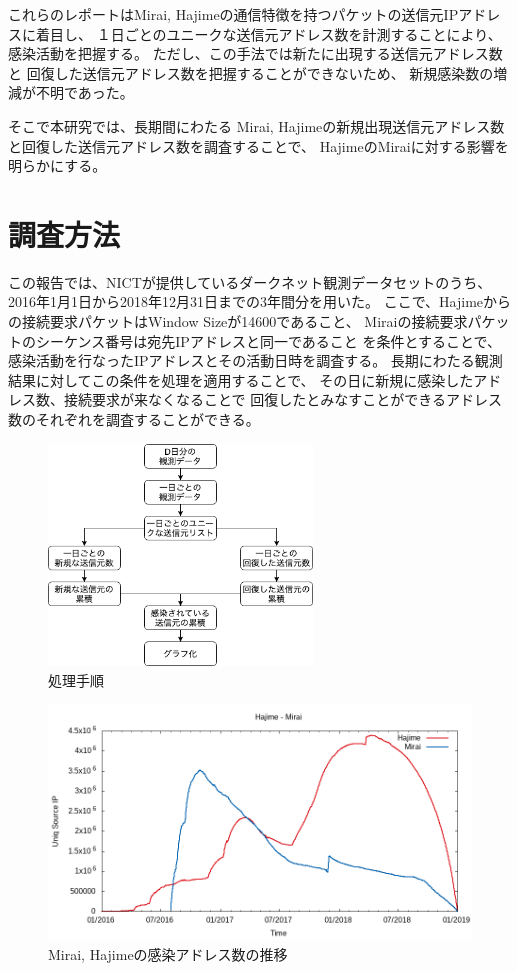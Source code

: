 \documentclass[a4j,fleqn,10pt]{jarticle}
\begin{document}
これらのレポートはMirai, Hajimeの通信特徴を持つパケットの送信元IPアドレスに着目し、
１日ごとのユニークな送信元アドレス数を計測することにより、感染活動を把握する。
ただし、この手法では新たに出現する送信元アドレス数と
回復した送信元アドレス数を把握することができないため、
新規感染数の増減が不明であった。
%

そこで本研究では、長期間にわたる
Mirai, Hajimeの新規出現送信元アドレス数と回復した送信元アドレス数を調査することで、
HajimeのMiraiに対する影響を明らかにする。
%


\section{調査方法}
この報告では、NICTが提供しているダークネット観測データセットのうち、
2016年1月1日から2018年12月31日までの3年間分を用いた。
%
ここで、Hajimeからの接続要求パケットはWindow Sizeが14600であること、
Miraiの接続要求パケットのシーケンス番号は宛先IPアドレスと同一であること\cite{nict18}
を条件とすることで、
感染活動を行なったIPアドレスとその活動日時を調査する。
%
長期にわたる観測結果に対してこの条件を処理を適用することで、
その日に新規に感染したアドレス数、接続要求が来なくなることで
回復したとみなすことができるアドレス数のそれぞれを調査することができる。


\begin{figure}[t]
\centering
\includegraphics[width=7cm]{method_1.png}
\caption{処理手順}\label{method}
\end{figure}


\begin{figure}[t]
\centering
\includegraphics[width=14cm]{result.png}
\caption{Mirai, Hajimeの感染アドレス数の推移}\label{result}
\end{figure}
\end{document}
